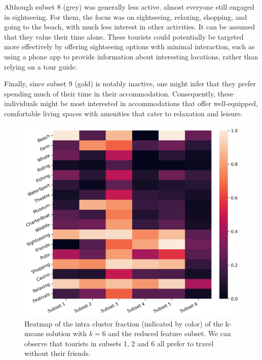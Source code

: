 \documentclass[article]{ajs}
\begin{document}
Although subset 8 (grey) was generally less active, almost everyone still engaged in sightseeing. For them, the focus was on sightseeing, relaxing, shopping, and going to the beach, with much less interest in other activities. It can be assumed that they value their time alone. These tourists could potentially be targeted more effectively by offering sightseeing options with minimal interaction, such as using a phone app to provide information about interesting locations, rather than relying on a tour guide.

Finally, since subset 9 (gold) is notably inactive, one might infer that they prefer spending much of their time in their accommodation. Consequently, these individuals might be most interested in accommodations that offer well-equipped, comfortable living spaces with amenities that cater to relaxation and leisure.


\begin{figure}[h!]
    \centering
    \includegraphics[width=1\textwidth]{aus_heatmap.png}
    \caption{Heatmap of the intra cluster fraction (indicated by color) of the k-means solution with \( k = 6 \) and the reduced feature subset. We can observe that tourists in subsets 1, 2 and 6 all prefer to travel without their friends.}
    \label{fig:aus_heatmapg}
\end{figure}
\end{document}

